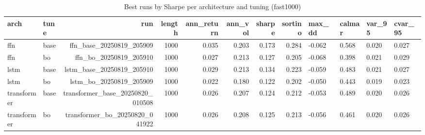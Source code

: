 \begin{table}[t]
\centering
\caption{Best runs by Sharpe per architecture and tuning (fast1000)}
\label{tab:arch_tune_best_fast}
\small
\begin{tabular}{l l r r r r r r}
\toprule
arch & tune & run & length & ann\_return & ann\_vol & sharpe & sortino & max\_dd & calmar & var\_95 & cvar\_95 \\ \midrule
ffn & base & ffn\_base\_20250819\_205909 & 1000 & 0.035 & 0.203 & 0.173 & 0.284 & -0.062 & 0.568 & 0.020 & 0.027 \\
ffn & bo & ffn\_bo\_20250819\_205910 & 1000 & 0.027 & 0.213 & 0.127 & 0.205 & -0.068 & 0.398 & 0.021 & 0.029 \\
lstm & base & lstm\_base\_20250819\_205910 & 1000 & 0.029 & 0.213 & 0.134 & 0.223 & -0.059 & 0.483 & 0.021 & 0.027 \\
lstm & bo & lstm\_bo\_20250819\_205909 & 1000 & 0.022 & 0.180 & 0.122 & 0.202 & -0.050 & 0.443 & 0.019 & 0.023 \\
transformer & base & transformer\_base\_20250820\_010508 & 1000 & 0.026 & 0.207 & 0.124 & 0.212 & -0.053 & 0.489 & 0.020 & 0.026 \\
transformer & bo & transformer\_bo\_20250820\_041922 & 1000 & 0.026 & 0.208 & 0.125 & 0.213 & -0.056 & 0.461 & 0.020 & 0.026 \\
\bottomrule
\end{tabular}
\end{table}